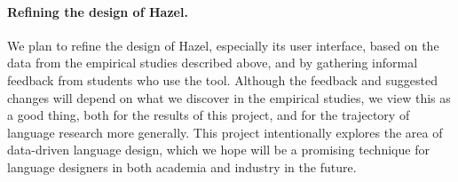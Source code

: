 \documentclass{purple}
\newcommand{\Hazel}[0]{\textsf{Hazel}\xspace}
\begin{document}
\paragraph{Refining the design of \Hazel.} 
We plan to refine the design of \Hazel, especially its user interface,
based on the data from the empirical studies described above, and by
gathering informal feedback from students who use the tool.
%
Although the feedback and suggested changes will depend on what we
discover in the empirical studies, we view this as a good thing, both
for the results of this project, and for the trajectory of language
research more generally.  This project intentionally explores the area
of data-driven language design, which we hope will be a promising
technique for language designers in both academia and industry in the
future.







\appendix
\end{document}
